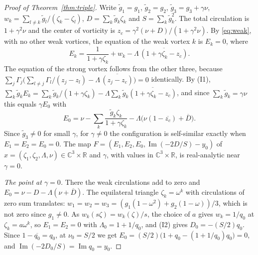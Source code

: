 \documentclass[11pt]{article}
\theoremstyle{definition}
\newcommand{\im}{\operatorname{Im}}
\newcommand{\C}{\mathbb{C}}
\newcommand{\R}{\mathbb{R}}
\begin{document}
\begin{proof}[Proof of Theorem~\ref{thm:triple}]
Write $\tilde g_1 = g_1$, $\tilde g_2 = g_2$, $\tilde g_3 = g_3 + \gamma\nu$, $w_k = \sum_{l \ne k}\tilde g_l/(\zeta_k - \zeta_l)$, $D = \sum_k \tilde g_k\zeta_k$ and $S = \sum_k \tilde g_k^2$. The total circulation is $1 + \gamma^2\nu$ and the center of vorticity is $z_c = \gamma^2(\nu + D)/(1 + \gamma^2\nu)$. By \eqref{eq:weak}, with no other weak vortices, the equation of the weak vortex $k$ is $E_k = 0$, where
\[
  E_k = \frac{1}{1 + \gamma\zeta_k} + w_k - \Lambda\,\overline{(1 + \gamma\zeta_k - z_c)} .
\]
The equation of the strong vortex follows from the other three, because $\sum_j \Gamma_j\bigl(\sum_{l \ne j}\Gamma_l/(z_j - z_l) - \Lambda\,\overline{(z_j - z_c)}\bigr) = 0$ identically. By (I1), $\sum_k \tilde g_kE_k = \sum_k \tilde g_k/(1 + \gamma\zeta_k) - \Lambda\sum_k \tilde g_k\overline{(1 + \gamma\zeta_k - z_c)}$, and since $\sum_k \tilde g_k = \gamma\nu$ this equals $\gamma E_0$ with
\[
  E_0 = \nu - \sum_k \frac{\tilde g_k\zeta_k}{1 + \gamma\zeta_k} - \Lambda\bigl(\nu(1 - \overline{z_c}) + \overline{D}\bigr).
\]
Since $\tilde g_3 \ne 0$ for small $\gamma$, for $\gamma \ne 0$ the configuration is self-similar exactly when $E_1 = E_2 = E_0 = 0$. The map $F = (E_1, E_2, E_0, \im(-2D/S) - y_0)$ of $x = (\zeta_1, \zeta_2, \Lambda, \nu) \in \C^3 \times \R$ and $\gamma$, with values in $\C^3 \times \R$, is real-analytic near $\gamma = 0$.

\emph{The point at $\gamma = 0$.} There the weak circulations add to zero and $E_0 = \nu - D - \Lambda(\nu + \overline{D})$. The equilateral triangle $\zeta_k = \omega^k$ with circulations of zero sum translates: $w_1 = w_2 = w_3 = (g_1(1 - \omega^2) + g_2(1 - \omega))/3$, which is not zero since $g_1 \ne 0$. As $w_k(s\zeta) = w_k(\zeta)/s$, the choice of $a$ gives $w_k = 1/q_0$ at $\zeta_k = a\omega^k$, so $E_1 = E_2 = 0$ with $\Lambda_0 = 1 + 1/q_0$, and (I2) gives $D_0 = -(S/2)q_0$. Since $1 - \overline{q_0} = q_0$, at $\nu_0 = S/2$ we get $E_0 = (S/2)\bigl(1 + q_0 - (1 + 1/q_0)q_0\bigr) = 0$, and $\im(-2D_0/S) = \im q_0 = y_0$.


\end{proof}
\end{document}
